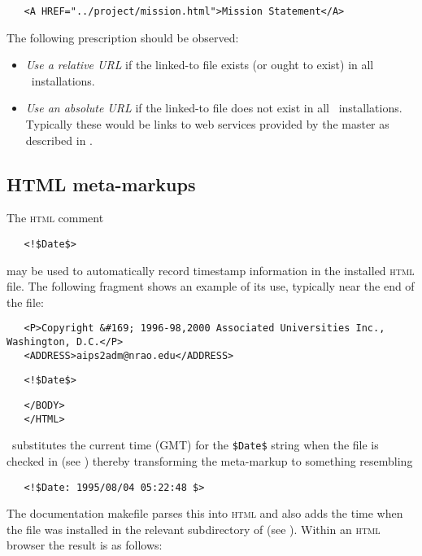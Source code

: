 \begin{verbatim}
   <A HREF="../project/mission.html">Mission Statement</A>
\end{verbatim}

\noindent
The following prescription should be observed:

\begin{itemize}
\item
   {\em Use a relative URL} if the linked-to file exists (or ought to exist)
   in all \aipspp\ installations.

\item
   {\em Use an absolute URL} if the linked-to file does not exist in all
   \aipspp\ installations.  Typically these would be links to web services
   provided by the master as described in .
\end{itemize}

\subsection*{HTML meta-markups}

The \textsc{html} comment

\noindent
\verb+   <!$+\verb+Date$>+

\noindent
may be used to automatically record timestamp information in the installed
\textsc{html} file.  The following fragment shows an example of its use,
typically near the end of the file:

\begin{verbatim}
   <P>Copyright &#169; 1996-98,2000 Associated Universities Inc., Washington, D.C.</P>
   <ADDRESS>aips2adm@nrao.edu</ADDRESS>
\end{verbatim}

\noindent
\verb+   <!$+\verb+Date$>+

\begin{verbatim}
   </BODY>
   </HTML>
\end{verbatim}

\noindent
\rcs\ substitutes the current time (GMT) for the \verb+$+\verb+Date$+ string
when the file is checked in (see ) thereby transforming the
meta-markup to something resembling

\noindent
\verb+   <!$+\verb+Date: 1995/08/04 05:22:48 $>+

\noindent
The documentation makefile parses this into \textsc{html} and also adds the
time when the  file was installed in the relevant subdirectory of
 (see ).  Within an \textsc{html} browser the
result is as follows:


